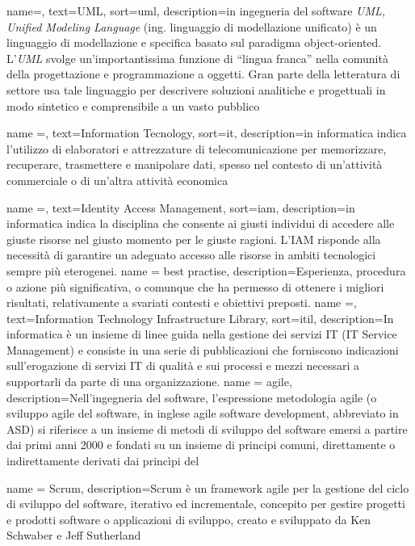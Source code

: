 {
    name=,
    text=UML,
    sort=uml,
    description={in ingegneria del software \emph{UML, Unified Modeling Language} (ing. linguaggio di modellazione unificato) è un linguaggio di modellazione e specifica basato sul paradigma object-oriented. L'\emph{UML} svolge un'importantissima funzione di ``lingua franca'' nella comunità della progettazione e programmazione a oggetti. Gran parte della letteratura di settore usa tale linguaggio per descrivere soluzioni analitiche e progettuali in modo sintetico e comprensibile a un vasto pubblico}
}

{
    name =,
    text=Information Tecnology,
    sort=it,
    description={in informatica indica l'utilizzo di elaboratori e attrezzature di telecomunicazione per memorizzare, recuperare, trasmettere e manipolare dati, spesso nel contesto di un'attività commerciale o di un'altra attività economica}
}

{
    name =,
    text=Identity Access Management,
    sort=iam,
    description={in informatica indica la disciplina che consente ai giusti individui di accedere alle giuste risorse nel giusto
    momento per le giuste ragioni. L’IAM risponde alla necessità di garantire un
    adeguato accesso alle risorse in ambiti tecnologici sempre più eterogenei.}
}
{
    name = best practise,
    description={Esperienza, procedura o azione più significativa, o comunque che ha permesso di
    ottenere i migliori risultati, relativamente a svariati contesti e obiettivi preposti.}
}
{
    name =,
    text=Information
    Technology Infrastructure Library,
    sort=itil,
    description={In informatica è un insieme di linee guida nella gestione dei servizi IT (IT Service Management) e consiste in una serie di pubblicazioni che forniscono indicazioni sull'erogazione di servizi IT di qualità e sui processi e mezzi necessari a supportarli da parte di una organizzazione.}
}
{
    name = agile,
    description={Nell'ingegneria del software, l'espressione metodologia agile (o sviluppo agile del software, in inglese agile software development, abbreviato in ASD) si riferisce a un insieme di metodi di sviluppo del software emersi a partire dai primi anni 2000 e fondati su un insieme di principi comuni, direttamente o indirettamente derivati dai princìpi del \citep{site:agile-manifesto}}
}

{
    name = Scrum,
    description={Scrum è un framework agile per la gestione del ciclo di sviluppo del software, iterativo ed incrementale, concepito per gestire progetti e prodotti software o applicazioni di sviluppo, creato e sviluppato da Ken Schwaber e Jeff Sutherland}
}


